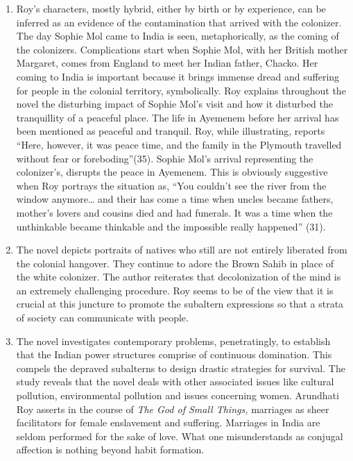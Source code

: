 \begin{enumerate}
  \item Roy’s characters, mostly hybrid, either by birth or by experience, can be inferred as an evidence of the contamination that arrived with the colonizer. The day Sophie Mol came to India is seen, metaphorically, as the coming of the colonizers. Complications start when Sophie Mol, with her British mother Margaret, comes from England to meet her Indian father, Chacko. Her coming to India is important because it brings immense dread and suffering for people in the colonial territory, symbolically. Roy explains throughout the novel the disturbing impact of Sophie Mol’s visit and how it disturbed the tranquillity of a peaceful place. The life in Ayemenem before her arrival has been mentioned as peaceful and tranquil. Roy, while illustrating, reports “Here, however, it was peace time, and the family in the Plymouth travelled without fear or foreboding”(35). Sophie Mol’s arrival representing the colonizer’s, disrupts the peace in Ayemenem. This is obviously suggestive when Roy portrays the situation as, “You couldn’t see the river from the window anymore… and their has come a time when uncles became fathers, mother’s lovers and cousins died and had funerals. It was a time when the unthinkable became thinkable and the impossible really happened” (31). 

  \item The novel depicts portraits of natives who still are not entirely liberated from the colonial hangover. They continue to adore the Brown Sahib in place of the white colonizer. The author reiterates that decolonization of the mind is an extremely challenging procedure. Roy seems to be of the view that it is crucial at this juncture to promote the subaltern expressions so that a strata of society can communicate with people.

  \item The novel investigates contemporary problems, penetratingly, to establish that the Indian power structures comprise of continuous domination. This compels the depraved subalterns to design drastic strategies for survival. The study reveals that the novel deals with other associated issues like cultural pollution, environmental pollution and issues concerning women. Arundhati Roy asserts in the course of \emph{The God of Small Things,} marriages as sheer facilitators for female enslavement and suffering. Marriages in India are seldom performed for the sake of love. What one misunderstands as conjugal affection is nothing beyond habit formation.


\end{enumerate}
